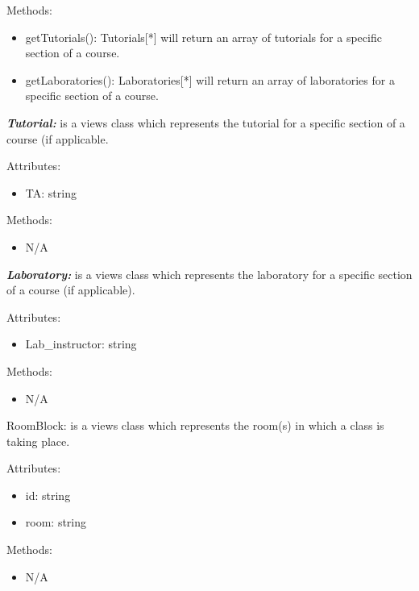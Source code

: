 Methods:

\begin{itemize}
\item
  getTutorials(): Tutorials{[}*{]} will return an array of tutorials for
  a specific section of a course.
\item
  getLaboratories(): Laboratories{[}*{]} will return an array of
  laboratories for a specific section of a course.
\end{itemize}

\textbf{\emph{Tutorial:}} is a views class which represents the tutorial
for a specific section of a course (if applicable.

Attributes:

\begin{itemize}
\item
  TA: string
\end{itemize}

Methods:

\begin{itemize}
\item
  N/A
\end{itemize}

\textbf{\emph{Laboratory:}} is a views class which represents the
laboratory for a specific section of a course (if applicable).

Attributes:

\begin{itemize}
\item
  Lab\_instructor: string
\end{itemize}

Methods:

\begin{itemize}
\item
  N/A
\end{itemize}

RoomBlock: is a views class which represents the room(s) in which a
class is taking place.

Attributes:

\begin{itemize}
\item
  id: string
\item
  room: string
\end{itemize}

Methods:

\begin{itemize}
\item
  N/A
\end{itemize}

